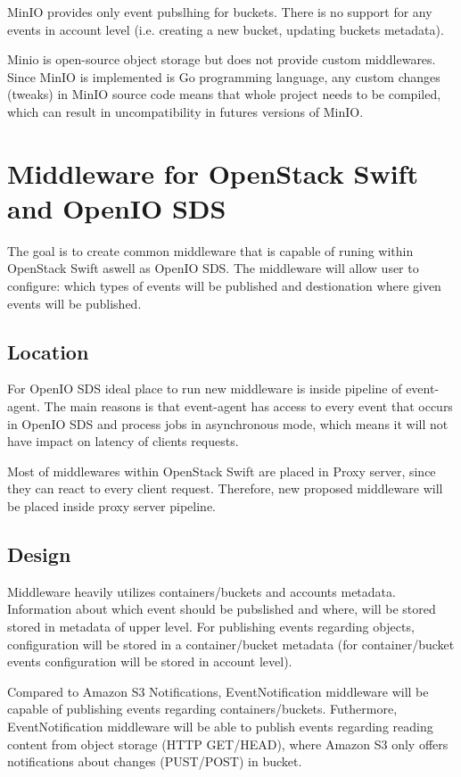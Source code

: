     MinIO provides only event pubslhing for buckets. There is no support for any events in account level (i.e. creating a new bucket, updating buckets metadata).

    Minio is open-source object storage but does not provide custom middlewares. Since MinIO is implemented is Go programming language, any custom changes (tweaks) in MinIO source code means that whole project needs to be compiled, which can result in uncompatibility in futures versions of MinIO.

\section{Middleware for OpenStack Swift and OpenIO SDS}
    The goal is to create common middleware that is capable of runing within OpenStack Swift aswell as OpenIO SDS. The middleware will allow user to configure: which types of events will be published and destionation where given events will be published.

    \subsection{Location}
    For OpenIO SDS ideal place to run new middleware is inside pipeline of event-agent. The main reasons is that event-agent has access to every event that occurs in OpenIO SDS and process jobs in asynchronous mode, which means it will not have impact on latency of clients requests.

    Most of middlewares within OpenStack Swift are placed in Proxy server, since they can react to every client request. Therefore, new proposed middleware will be placed inside proxy server pipeline.

    \subsection{Design}
    Middleware heavily utilizes containers/buckets and accounts metadata. Information about which event should be pubslished and where, will be stored stored in metadata of upper level. For publishing events regarding objects, configuration will be stored in a container/bucket metadata (for container/bucket events configuration will be stored in account level).

    Compared to Amazon S3 Notifications, EventNotification middleware will be capable of publishing events regarding containers/buckets. Futhermore, EventNotification middleware will be able to publish events regarding reading content from object storage (HTTP GET/HEAD), where Amazon S3 only offers notifications about changes (PUST/POST) in bucket.

